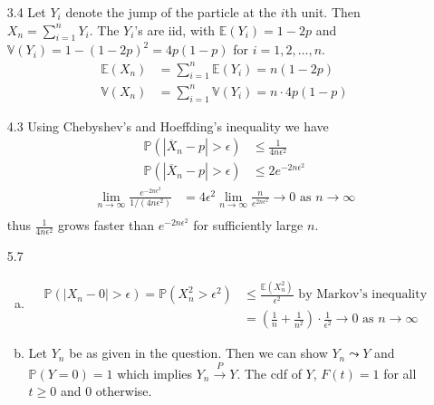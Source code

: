 \documentclass[a4paper,10pt]{article}
\theoremstyle{definition}
\begin{document}
\begin{enumerate}
\item[3.4] Let $Y_i$ denote the jump of the particle at the $i$th unit. Then $X_n=\sum_{i=1}^nY_i$. The $Y_i$'s are iid, with $\mathbb{E}(Y_i)=1-2p$ and $\mathbb{V}(Y_i) = 1 - (1-2p)^2 = 4p(1-p)$ for $i=1,2,\ldots, n$.
\begin{align*}
\mathbb{E}(X_n) &= \sum_{i=1}^n\mathbb{E}(Y_i) = n(1-2p)\\
\mathbb{V}(X_n) &= \sum_{i=1}^n\mathbb{V}(Y_i) = n\cdot4p(1-p)
\end{align*}
\item[4.3] Using Chebyshev's and Hoeffding's inequality we have
\begin{align*}
\mathbb{P}(|\overline{X}_n - p|>\epsilon) &\leq \frac{1}{4n \epsilon^2} \\
\mathbb{P}(|\overline{X}_n - p|>\epsilon) &\leq 2e^{-2n\epsilon^2}
\end{align*}
\begin{align*}
\lim_{n\to\infty}\frac{e^{-2n\epsilon^2}}{1/(4n\epsilon^2)}&=4\epsilon^2\lim_{n\to\infty}\frac{n}{e^{2n\epsilon^2}}\to 0 \text{ as } n \to \infty\\
\end{align*}
thus $\frac{1}{4n\epsilon^2}$ grows faster than $e^{-2n\epsilon^2}$ for sufficiently large $n$.
\item[5.7] 
\begin{enumerate}[(a)]
\item 
\begin{align*}
\mathbb{P}(|X_n-0|> \epsilon) = \mathbb{P}(X_n^2> \epsilon^2)&\leq \frac{\mathbb{E}(X_n^2)}{\epsilon^2} \text{ by Markov's inequality}\\
&=\left(\frac{1}{n}+\frac{1}{n^2}\right)\cdot\frac{1}{\epsilon^2} \to 0 \text{ as } n \to \infty
\end{align*}
\item Let $Y_n$ be as given in the question. Then we can show $Y_n \leadsto Y$ and $\mathbb{P}(Y=0)=1$ which implies $Y_n \overset{P}{\to} Y$. The cdf of $Y$, $F(t)=1$ for all $t\geq0$ and 0 otherwise.

\end{enumerate}
\end{enumerate}
\end{document}
